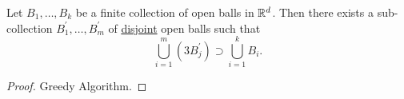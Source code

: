 \begin{lemma}\label{lma:Vitali-type-covering-lemma}
	Let \(B_1, \ldots , B_k \) be a finite collection of open balls in \(\mathbb{\MakeUppercase{r}} ^d\). Then there
	exists a sub-collection \(B^\prime _1, \ldots , B^\prime _m \) of \underline{disjoint} open balls such that
	\[
		\bigcup\limits_{i=1}^{m} \left(3 B_{j} ^\prime \right)\supset \bigcup\limits_{i=1}^{k} B_{i}.
	\]
\end{lemma}
\begin{proof}
	Greedy Algorithm.
\end{proof}